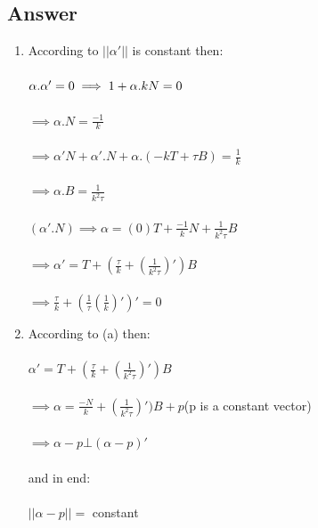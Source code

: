\documentclass[
	12pt, %
]{fphw}
\theoremstyle{plain}
\begin{document}
\subsection*{Answer}
\begin{enumerate}
     \item According to $||\alpha'||$ is constant then:\\   \\ $\alpha.\alpha' = 0\\  \\ \implies 1 + \alpha.kN =0$\\  \\ $\implies \alpha.N = \frac{-1}{k}$\\  \\$\implies \alpha'N + \alpha'.N + \alpha.(-kT + \tau B) = \frac{1}{k}$\\  
       \\$\implies \alpha.B = \frac{1}{k^2 \tau}$\\  \\$(\alpha'.N)\implies \alpha = (0)T + \frac{-1}{k}N + \frac{1}{k^2 \tau}B$\\  \\$\implies \alpha' = T + (\frac{\tau}{k} + (\frac{1}{k^2 \tau})')B$\\  
         \\$\implies \frac{\tau}{k} + (\frac{1}{\tau}(\frac{1}{k})')' = 0$\\
     \item According to (a) then:\\  \\$\alpha' =  T + (\frac{\tau}{k} + (\frac{1}{k^2 \tau})')B$\\
       \\$\implies \alpha = \frac{-N}{k} + (\frac{1}{k^2 \tau})')B + p$(p is a constant vector)\\
       \\$\implies \alpha - p \bot (\alpha - p)'$\\  \\and in end:\\  \\$||\alpha - p|| =$ constant\\
\end{enumerate}
\end{document}
